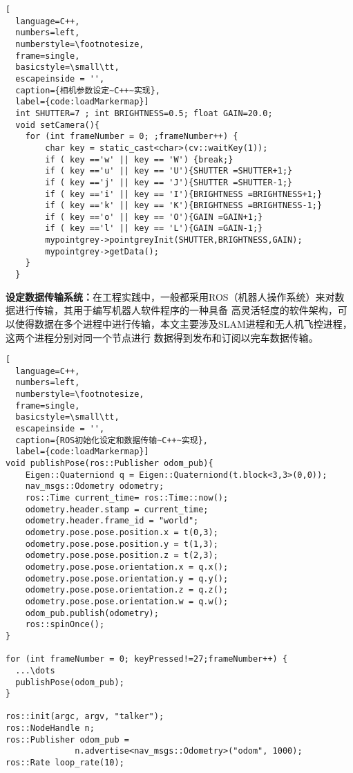 \begin{lstlisting}[
  language=C++,
  numbers=left,                
  numberstyle=\footnotesize,
  frame=single,     
  basicstyle=\small\tt,    
  escapeinside = '',
  caption={相机参数设定~C++~实现},
  label={code:loadMarkermap}]
  int SHUTTER=7 ; int BRIGHTNESS=0.5; float GAIN=20.0;
  void setCamera(){
    for (int frameNumber = 0; ;frameNumber++) {
        char key = static_cast<char>(cv::waitKey(1));
        if ( key =='w' || key == 'W') {break;}
        if ( key =='u' || key == 'U'){SHUTTER =SHUTTER+1;}
        if ( key =='j' || key == 'J'){SHUTTER =SHUTTER-1;}
        if ( key =='i' || key == 'I'){BRIGHTNESS =BRIGHTNESS+1;}
        if ( key =='k' || key == 'K'){BRIGHTNESS =BRIGHTNESS-1;}
        if ( key =='o' || key == 'O'){GAIN =GAIN+1;}
        if ( key =='l' || key == 'L'){GAIN =GAIN-1;}
        mypointgrey->pointgreyInit(SHUTTER,BRIGHTNESS,GAIN);
        mypointgrey->getData();
    }
  }
\end{lstlisting}
\textbf{设定数据传输系统：}在工程实践中，一般都采用ROS（机器人操作系统）来对数据进行传输，其用于编写机器人软件程序的一种具备
高灵活轻度的软件架构，可以使得数据在多个进程中进行传输，本文主要涉及SLAM进程和无人机飞控进程，这两个进程分别对同一个节点进行
数据得到发布和订阅以完车数据传输。
\begin{lstlisting}[
  language=C++,
  numbers=left,                
  numberstyle=\footnotesize,
  frame=single,     
  basicstyle=\small\tt,    
  escapeinside = '',
  caption={ROS初始化设定和数据传输~C++~实现},
  label={code:loadMarkermap}]
void publishPose(ros::Publisher odom_pub){
    Eigen::Quaterniond q = Eigen::Quaterniond(t.block<3,3>(0,0));      
    nav_msgs::Odometry odometry;
    ros::Time current_time= ros::Time::now();
    odometry.header.stamp = current_time;
    odometry.header.frame_id = "world";
    odometry.pose.pose.position.x = t(0,3);
    odometry.pose.pose.position.y = t(1,3);
    odometry.pose.pose.position.z = t(2,3);
    odometry.pose.pose.orientation.x = q.x();
    odometry.pose.pose.orientation.y = q.y();
    odometry.pose.pose.orientation.z = q.z();
    odometry.pose.pose.orientation.w = q.w();
    odom_pub.publish(odometry);  
    ros::spinOnce();        
}

for (int frameNumber = 0; keyPressed!=27;frameNumber++) {
  ...\dots
  publishPose(odom_pub);   
}

ros::init(argc, argv, "talker");  
ros::NodeHandle n;  
ros::Publisher odom_pub = 
              n.advertise<nav_msgs::Odometry>("odom", 1000);      
ros::Rate loop_rate(10);  
\end{lstlisting}

